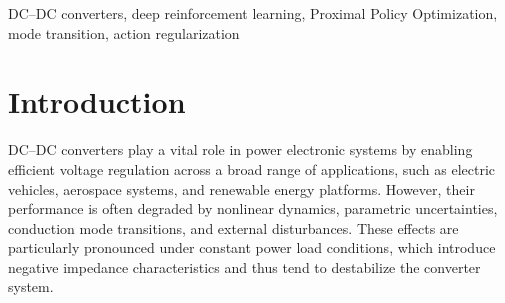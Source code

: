 \documentclass[conference]{IEEEtran}
\begin{document}
\begin{abstract}
DC--DC converters are critical components in modern power electronic systems. However, their performance can be significantly affected by nonlinear dynamics, parameter uncertainties, and mode transitions, especially under constant power loads that introduce negative impedance characteristics. To address these challenges, this work proposes a model-free control strategy based on the Proximal Policy Optimization (PPO) algorithm within a deep reinforcement learning (DRL) framework. The proposed controller incorporates four core innovations: 
(i) an expanded observation space including inductor current to improve adaptability and transient response;  
(ii) a reward function designed using the square root of normalized voltage error to enhance steady-state precision and convergence speed;  
(iii) an action regularization mechanism that discourages abrupt duty cycle changes, promoting smooth switching and reducing stress on components; and  
(iv) a unified PPO policy capable of seamless operation across continuous and discontinuous conduction modes without explicit mode detection.
The controller is trained using a high-fidelity MATLAB/Simulink simulation environment and is evaluated under a wide range of operating conditions, including input voltage variation, load disturbances, and component uncertainties. Simulation results confirm significant improvements in voltage regulation accuracy, dynamic performance, and robustness.
\end{abstract}


\begin{IEEEkeywords}
DC–DC converters, deep reinforcement learning, Proximal Policy Optimization, mode transition, action regularization
\end{IEEEkeywords}

\section{Introduction}

DC--DC converters play a vital role in power electronic systems by enabling efficient voltage regulation across a broad range of applications, such as electric vehicles, aerospace systems, and renewable energy platforms. However, their performance is often degraded by nonlinear dynamics, parametric uncertainties, conduction mode transitions, and external disturbances. These effects are particularly pronounced under constant power load conditions, which introduce negative impedance characteristics and thus tend to destabilize the converter system.
\end{document}
